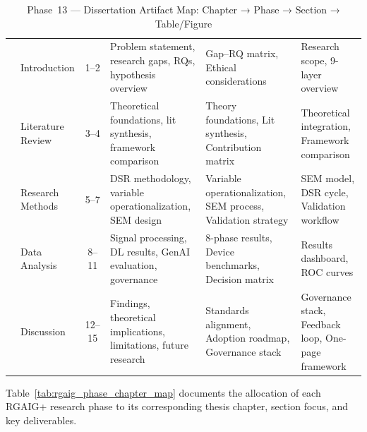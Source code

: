 \begingroup\singlespacing\tablefontsize\tablestripes
\begin{xltabular}{\textwidth}{@{} c p{0.12\textwidth} c X X X @{}}
\caption[Phase~13 --- Dissertation Artifact Map: Chapter → Phase]{Phase~13 --- Dissertation Artifact Map: Chapter → Phase → Section → Table/Figure}
\label{tab:rgaig_artifact_map}\\
\toprule
{} &  &  &  &  &  \\
\midrule
\endfirsthead
\endhead
\bottomrule
{} & Introduction & 1--2 & Problem statement, research gaps, RQs, hypothesis overview & Gap--RQ matrix, Ethical considerations & Research scope, 9-layer overview \\
 & Literature Review & 3--4 & Theoretical foundations, lit synthesis, framework comparison & Theory foundations, Lit synthesis, Contribution matrix & Theoretical integration, Framework comparison \\
 & Research Methods & 5--7 & DSR methodology, variable operationalization, SEM design & Variable operationalization, SEM process, Validation strategy & SEM model, DSR cycle, Validation workflow \\
 & Data Analysis & 8--11 & Signal processing, DL results, GenAI evaluation, governance & 8-phase results, Device benchmarks, Decision matrix & Results dashboard, ROC curves \\
 & Discussion & 12--15 & Findings, theoretical implications, limitations, future research & Standards alignment, Adoption roadmap, Governance stack & Governance stack, Feedback loop, One-page framework \\
\end{xltabular}
\endgroup

\vspace{1.5em}

Table~\ref{tab:rgaig_phase_chapter_map} documents the allocation of each RGAIG+ research phase to its corresponding thesis chapter, section focus, and key deliverables.

